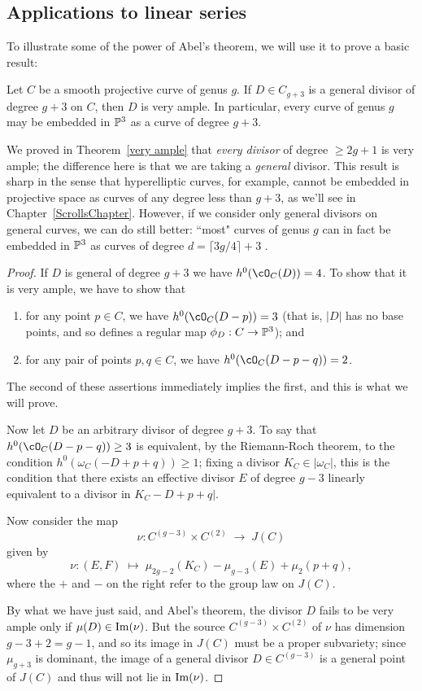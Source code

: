 \subsection{Applications to linear series}

To illustrate some of the power of Abel's theorem, we will use it to prove a basic result:

\begin{theorem}\label{g+3 theorem}
Let $C$ be a smooth projective curve of genus $g$. If $D \in C_{g+3}$ is a general divisor of degree $g+3$ on $C$, then 
$D$ is very ample. In particular, every curve of genus $g$ may be embedded in $\PP^{3}$ as a curve of degree $g+3$.
\end{theorem}

We proved in Theorem~\ref{very ample} that \emph{every divisor} of degree $\geq 2g+1$ is very ample; the difference here is that we are taking a \emph{general} divisor. This result is sharp in the sense that hyperelliptic curves, for example, cannot be embedded in projective space as curves of any degree less than $g+3$, as we'll see in Chapter~\ref{ScrollsChapter}. However, if we consider only general divisors on general curves, we can do still better: ``most" curves of genus $g$ can in fact be embedded in $\PP^{3}$ as curves of degree $d = \lceil 3g/4 \rceil + 3$ \cite{}.

\begin{proof}
If $D$ is general of degree $g+3$ we have $h^0(\cO_C(D)) = 4$. To show that it is very ample, we have to show that
\begin{enumerate}
\item for any point $p \in C$, we have $h^0(\cO_C(D-p)) = 3$ (that is, $|D|$ has no base points, and so defines a regular map $\phi_D : C \to \PP^3$); and
\item for any pair of points $p, q \in C$, we have $h^0(\cO_C(D-p-q)) = 2$.
\end{enumerate}
The second of these assertions immediately implies the first, and this is what we will prove.

Now let $D$ be an arbitrary divisor of degree $g+3$. To say that $h^0(\cO_C(D-p-q)) \geq 3$ is equivalent, by the Riemann-Roch theorem, to the condition $h^0(\omega_C(-D + p + q)) \geq 1$; fixing a divisor 
$K_{C}\in |\omega_{C}|$, this is the condition that there exists  
an effective divisor $E$ of degree $g-3$ linearly equivalent to a divisor in $K_C - D + p + q|$. 

Now consider the map 
$$
\nu : C^{(g-3)} \times C^{(2)} \; \to \; J(C)
$$
given by
$$
\nu : (E,F) \; \mapsto \; \mu_{2g-2}(K_C) - \mu_{g-3}(E) + \mu_{2}(p+q), 
$$
where the $+$ and $-$ on the right refer to the group law on $J(C)$. 

By what we have just said, and Abel's theorem, the divisor $D$ fails to be very ample only if
$\mu(D) \in {\rm Im}(\nu)$. But the source $C^{(g-3)} \times C^{(2)}$ of $\nu$ has dimension $g-3+2 = g-1$, and so its image in $J(C)$ must be a proper subvariety; since $\mu_{g+3}$ is dominant, the image of a general divisor $D \in C^{(g-3)}$ is a general point of $J(C)$ and thus will not lie in ${\rm Im}(\nu)$. 
\end{proof}


